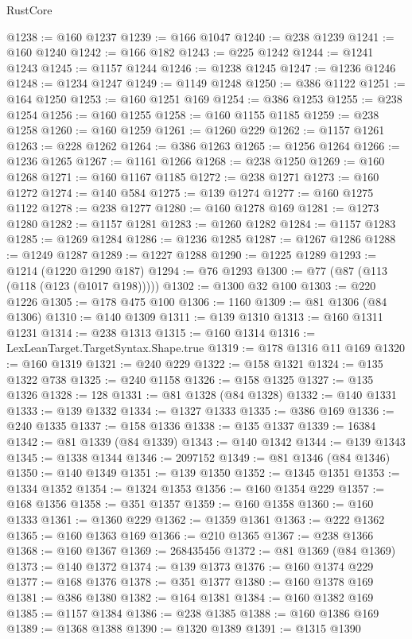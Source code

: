\begin{lexlean}{RustCore}
\begin{coremodule}
@1238 := @160 @1237
@1239 := @166 @1047
@1240 := @238 @1239
@1241 := @160 @1240
@1242 := @166 @182
@1243 := @225 @1242
@1244 := @1241 @1243
@1245 := @1157 @1244
@1246 := @1238 @1245
@1247 := @1236 @1246
@1248 := @1234 @1247
@1249 := @1149 @1248
@1250 := @386 @1122
@1251 := @164 @1250
@1253 := @160 @1251 @169
@1254 := @386 @1253
@1255 := @238 @1254
@1256 := @160 @1255
@1258 := @160 @1155 @1185
@1259 := @238 @1258
@1260 := @160 @1259
@1261 := @1260 @229
@1262 := @1157 @1261
@1263 := @228 @1262
@1264 := @386 @1263
@1265 := @1256 @1264
@1266 := @1236 @1265
@1267 := @1161 @1266
@1268 := @238 @1250
@1269 := @160 @1268
@1271 := @160 @1167 @1185
@1272 := @238 @1271
@1273 := @160 @1272
@1274 := @140 @584
@1275 := @139 @1274
@1277 := @160 @1275 @1122
@1278 := @238 @1277
@1280 := @160 @1278 @169
@1281 := @1273 @1280
@1282 := @1157 @1281
@1283 := @1260 @1282
@1284 := @1157 @1283
@1285 := @1269 @1284
@1286 := @1236 @1285
@1287 := @1267 @1286
@1288 := @1249 @1287
@1289 := @1227 @1288
@1290 := @1225 @1289
@1293 := @1214 (@1220 @1290 @187)
@1294 := @76 @1293
@1300 := @77 (@87 (@113 (@118 (@123 (@1017 @198)))))
@1302 := @1300 @32 @100
@1303 := @220 @1226
@1305 := @178 @475 @100
@1306 := 1160
@1309 := @81 @1306 (@84 @1306)
@1310 := @140 @1309
@1311 := @139 @1310
@1313 := @160 @1311 @1231
@1314 := @238 @1313
@1315 := @160 @1314
@1316 := LexLeanTarget.TargetSyntax.Shape.true
@1319 := @178 @1316 @11 @169
@1320 := @160 @1319
@1321 := @240 @229
@1322 := @158 @1321
@1324 := @135 @1322 @738
@1325 := @240 @1158
@1326 := @158 @1325
@1327 := @135 @1326
@1328 := 128
@1331 := @81 @1328 (@84 @1328)
@1332 := @140 @1331
@1333 := @139 @1332
@1334 := @1327 @1333
@1335 := @386 @169
@1336 := @240 @1335
@1337 := @158 @1336
@1338 := @135 @1337
@1339 := 16384
@1342 := @81 @1339 (@84 @1339)
@1343 := @140 @1342
@1344 := @139 @1343
@1345 := @1338 @1344
@1346 := 2097152
@1349 := @81 @1346 (@84 @1346)
@1350 := @140 @1349
@1351 := @139 @1350
@1352 := @1345 @1351
@1353 := @1334 @1352
@1354 := @1324 @1353
@1356 := @160 @1354 @229
@1357 := @168 @1356
@1358 := @351 @1357
@1359 := @160 @1358
@1360 := @160 @1333
@1361 := @1360 @229
@1362 := @1359 @1361
@1363 := @222 @1362
@1365 := @160 @1363 @169
@1366 := @210 @1365
@1367 := @238 @1366
@1368 := @160 @1367
@1369 := 268435456
@1372 := @81 @1369 (@84 @1369)
@1373 := @140 @1372
@1374 := @139 @1373
@1376 := @160 @1374 @229
@1377 := @168 @1376
@1378 := @351 @1377
@1380 := @160 @1378 @169
@1381 := @386 @1380
@1382 := @164 @1381
@1384 := @160 @1382 @169
@1385 := @1157 @1384
@1386 := @238 @1385
@1388 := @160 @1386 @169
@1389 := @1368 @1388
@1390 := @1320 @1389
@1391 := @1315 @1390

\end{coremodule}
\end{lexlean}
